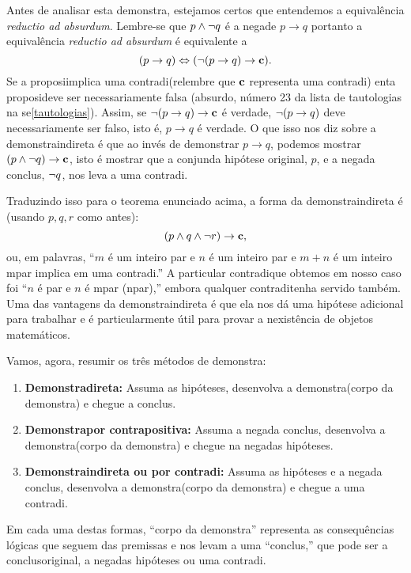 Antes de analisar esta demonstra\caoi, estejamos certos que entendemos a equival\^encia {\it reductio ad absurdum}. Lembre-se que $p\wedge\lnot q$ \'e a nega\cao de $p\to q$ portanto a equival\^encia {\it reductio ad absurdum} \'e equivalente a
\[
(p\to q)\Leftrightarrow (\lnot(p\to q)\to {\bf c}).
\]
Se a proposi\cao implica uma contradi\cao (relembre que ${\bf c}$ representa uma contradi\caoi) ent\ao a proposi\cao deve ser necessariamente falsa (absurdo, n\'umero 23 da lista de tautologias na se\cao \ref{tautologias}). Assim, se $\lnot(p\to q)\to {\bf c}$ \'e verdade, $\lnot(p\to q)$ deve necessariamente ser falso, isto \'e, $p\to q$ \'e verdade. O que isso nos diz sobre a demonstra\cao indireta \'e que ao inv\'es  de demonstrar $p\to q$, podemos mostrar $(p\wedge\lnot q)\to {\bf c}$, isto \'e mostrar que a conjun\cao da hip\'otese original, $p$, e a nega\cao da conclus\aoi, $\lnot q$, nos leva a uma contradi\caoi.

Traduzindo isso para o teorema enunciado acima, a forma da demonstra\cao indireta \'e (usando $p,q,r$ como antes):
\[
(p\wedge q \wedge\lnot r)\to {\bf c},
\]
ou, em palavras, ``$m$ \'e um inteiro par e $n$ \'e um inteiro par e $m+n$ \'e um inteiro \ih mpar implica em uma contradi\caoi.'' A particular contradi\cao que obtemos em nosso caso foi ``$n$ \'e par e $n$ \'e \ih mpar (n\ao par),'' embora qualquer contradi\cao tenha servido tamb\'em. Uma das vantagens da demonstra\cao indireta \'e que ela nos d\'a uma hip\'otese adicional para trabalhar e \'e particularmente \'util para provar a n\ao exist\^encia de objetos matem\'aticos.

Vamos, agora, resumir os tr\^es m\'etodos de demonstra\caoi:
\begin{enumerate}[{\bf a)}]
\item {\bf Demonstra\cao direta:} Assuma as hip\'oteses, desenvolva a demonstra\cao (corpo da demonstra\caoi) e chegue a conclus\aoi.
\item {\bf Demonstra\cao por contrapositiva:} Assuma a nega\cao da conclus\aoi, desenvolva a demonstra\cao (corpo da demonstra\caoi) e chegue na nega\cao das hip\'oteses.
\item {\bf Demonstra\cao indireta ou por contradi\caoi:} Assuma as hip\'oteses e a nega\cao da conclus\aoi, desenvolva a demonstra\cao (corpo da demonstra\caoi) e chegue a uma contradi\caoi.
\end{enumerate}
Em cada uma destas formas, ``corpo da demonstra\caoi'' representa as consequ\^encias l\'ogicas que seguem das premissas e nos levam a uma ``conclus\aoi,'' que pode ser a conclus\ao original, a nega\cao das hip\'oteses ou uma contradi\caoi.

